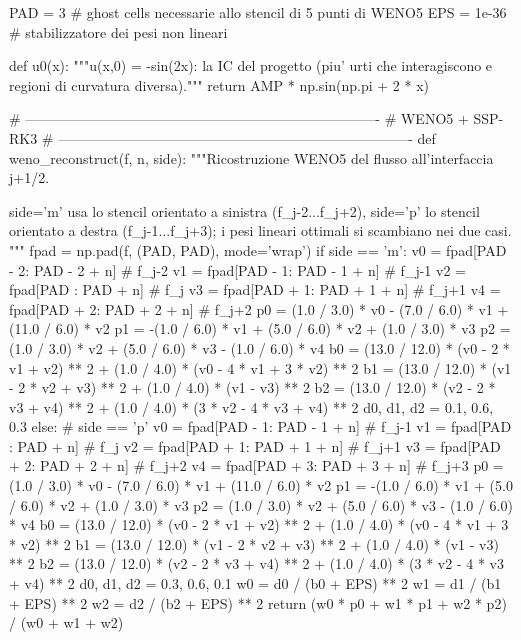 \documentclass[12pt]{article}
\begin{document}
\begin{pythoncode}[title=Implementazione WENO]
PAD = 3            # ghost cells necessarie allo stencil di 5 punti di WENO5
EPS = 1e-36        # stabilizzatore dei pesi non lineari


def u0(x):
    """u(x,0) = -sin(2x): la IC del progetto (piu' urti che interagiscono e
    regioni di curvatura diversa)."""
    return AMP * np.sin(np.pi + 2 * x)


# ----------------------------------------------------------------------------
# WENO5 + SSP-RK3
# ----------------------------------------------------------------------------
def weno_reconstruct(f, n, side):
    """Ricostruzione WENO5 del flusso all'interfaccia j+1/2.

    side='m' usa lo stencil orientato a sinistra (f_{j-2}...f_{j+2}),
    side='p' lo stencil orientato a destra   (f_{j-1}...f_{j+3});
    i pesi lineari ottimali si scambiano nei due casi.
    """
    fpad = np.pad(f, (PAD, PAD), mode='wrap')
    if side == 'm':
        v0 = fpad[PAD - 2: PAD - 2 + n]   # f_{j-2}
        v1 = fpad[PAD - 1: PAD - 1 + n]   # f_{j-1}
        v2 = fpad[PAD    : PAD     + n]   # f_j
        v3 = fpad[PAD + 1: PAD + 1 + n]   # f_{j+1}
        v4 = fpad[PAD + 2: PAD + 2 + n]   # f_{j+2}
        p0 = (1.0 / 3.0) * v0 - (7.0 / 6.0) * v1 + (11.0 / 6.0) * v2
        p1 = -(1.0 / 6.0) * v1 + (5.0 / 6.0) * v2 + (1.0 / 3.0) * v3
        p2 = (1.0 / 3.0) * v2 + (5.0 / 6.0) * v3 - (1.0 / 6.0) * v4
        b0 = (13.0 / 12.0) * (v0 - 2 * v1 + v2) ** 2 + (1.0 / 4.0) * (v0 - 4 * v1 + 3 * v2) ** 2
        b1 = (13.0 / 12.0) * (v1 - 2 * v2 + v3) ** 2 + (1.0 / 4.0) * (v1 - v3) ** 2
        b2 = (13.0 / 12.0) * (v2 - 2 * v3 + v4) ** 2 + (1.0 / 4.0) * (3 * v2 - 4 * v3 + v4) ** 2
        d0, d1, d2 = 0.1, 0.6, 0.3
    else:                                  # side == 'p'
        v0 = fpad[PAD - 1: PAD - 1 + n]   # f_{j-1}
        v1 = fpad[PAD    : PAD     + n]   # f_j
        v2 = fpad[PAD + 1: PAD + 1 + n]   # f_{j+1}
        v3 = fpad[PAD + 2: PAD + 2 + n]   # f_{j+2}
        v4 = fpad[PAD + 3: PAD + 3 + n]   # f_{j+3}
        p0 = (1.0 / 3.0) * v0 - (7.0 / 6.0) * v1 + (11.0 / 6.0) * v2
        p1 = -(1.0 / 6.0) * v1 + (5.0 / 6.0) * v2 + (1.0 / 3.0) * v3
        p2 = (1.0 / 3.0) * v2 + (5.0 / 6.0) * v3 - (1.0 / 6.0) * v4
        b0 = (13.0 / 12.0) * (v0 - 2 * v1 + v2) ** 2 + (1.0 / 4.0) * (v0 - 4 * v1 + 3 * v2) ** 2
        b1 = (13.0 / 12.0) * (v1 - 2 * v2 + v3) ** 2 + (1.0 / 4.0) * (v1 - v3) ** 2
        b2 = (13.0 / 12.0) * (v2 - 2 * v3 + v4) ** 2 + (1.0 / 4.0) * (3 * v2 - 4 * v3 + v4) ** 2
        d0, d1, d2 = 0.3, 0.6, 0.1
    w0 = d0 / (b0 + EPS) ** 2
    w1 = d1 / (b1 + EPS) ** 2
    w2 = d2 / (b2 + EPS) ** 2
    return (w0 * p0 + w1 * p1 + w2 * p2) / (w0 + w1 + w2)



\end{pythoncode}
\end{document}
